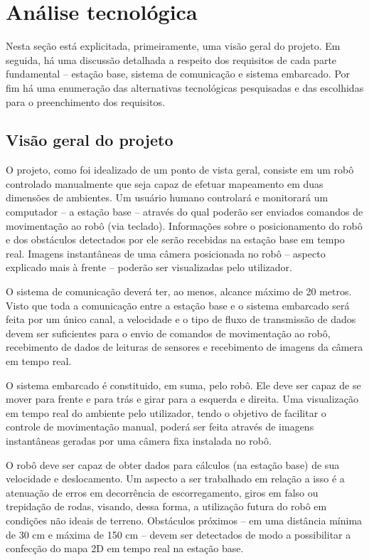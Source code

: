 \chapter{Análise tecnológica}
Nesta seção está explicitada, primeiramente, uma visão geral do projeto. Em seguida, há uma discussão detalhada a respeito dos requisitos de cada parte fundamental -- estação base, sistema de comunicação e sistema embarcado. Por fim há uma enumeração das alternativas tecnológicas pesquisadas e das escolhidas para o preenchimento dos requisitos.

\section{Visão geral do projeto}

O projeto, como foi idealizado de um ponto de vista geral, consiste em um robô controlado manualmente que seja capaz de efetuar mapeamento em duas dimensões de ambientes. Um usuário humano controlará e monitorará um computador -- a estação base -- através do qual poderão ser enviados comandos de movimentação ao robô (via teclado). Informações sobre o posicionamento do robô e dos obstáculos detectados por ele serão recebidas na estação base em tempo real. Imagens instantâneas de uma câmera posicionada no robô -- aspecto explicado mais à frente -- poderão ser visualizadas pelo utilizador.

O sistema de comunicação deverá ter, ao menos, alcance máximo de 20 metros. Visto que toda a comunicação entre a estação base e o sistema embarcado será feita por um único canal, a velocidade e o tipo de fluxo de transmissão de dados devem ser suficientes para o envio de comandos de movimentação ao robô, recebimento de dados de leituras de sensores e recebimento de imagens da câmera em tempo real.

O sistema embarcado é constituido, em suma, pelo robô. Ele deve ser capaz de se mover para frente e para trás e girar para a esquerda e direita. Uma visualização em tempo real do ambiente pelo utilizador, tendo o objetivo de facilitar o controle de movimentação manual, poderá ser feita através de imagens instantâneas geradas por uma câmera fixa instalada no robô. 

O robô deve ser capaz de obter dados para cálculos (na estação base) de sua velocidade e deslocamento. Um aspecto a ser trabalhado em relação a isso é a atenuação de erros em decorrência de escorregamento, giros em falso ou trepidação de rodas, visando, dessa forma, a utilização futura do robô em condições não ideais de terreno. Obstáculos próximos -- em uma distância mínima de 30 cm e máxima de 150 cm -- devem ser detectados de modo a possibilitar a confecção do mapa 2D em tempo real na estação base.


